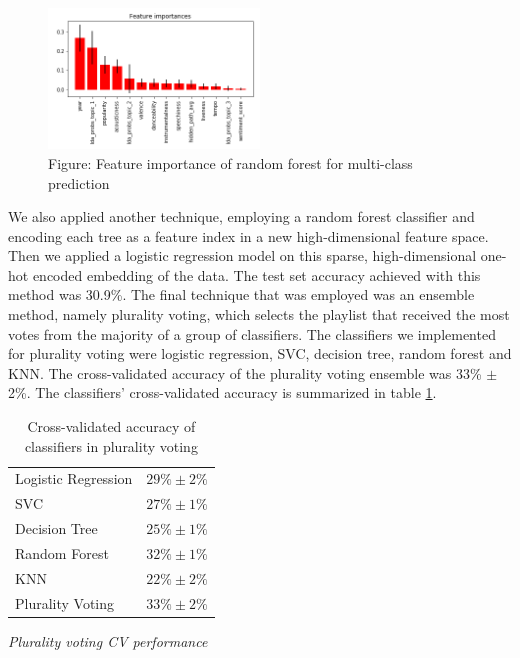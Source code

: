 \documentclass[acmtog]{acmart}
\begin{document}
\begin{figure}[h]
  \includegraphics[width=0.5\textwidth]{feature_importance2.png}
  \caption{Figure: Feature importance of random forest for multi-class prediction}
  \label{fig:ROC_curve}
\end{figure}

\newpage

We also applied another technique, employing a random forest classifier and encoding each tree as a feature index in a new high-dimensional feature space. Then we applied a logistic regression model on this sparse, high-dimensional one-hot encoded embedding of the data. The test set accuracy achieved with this method was 30.9\%.
The final technique that was employed was an ensemble method, namely plurality voting, which selects the playlist that received the most votes from the majority of a group of classifiers. The classifiers we implemented for plurality voting were logistic regression, SVC, decision tree, random forest and KNN. The cross-validated accuracy of the plurality voting ensemble was 33\% $\pm$ 2\%. The classifiers' cross-validated accuracy is summarized in table \ref{tab:two}.  
\begin{table}%
\caption{Cross-validated accuracy of classifiers in plurality voting}
\label{tab:two}
\begin{minipage}{\columnwidth}
\begin{center}
\begin{tabular}{ll}
  \toprule
  Logistic Regression    & $29\% \pm 2\%$\\
  SVC  & $27\% \pm 1\%$\\
  Decision Tree  & $25\% \pm 1\%$\\
  Random Forest  & $32\% \pm 1\%$\\
  KNN  & $22\% \pm 2\%$\\
  Plurality Voting  & $33\% \pm 2\%$\\
  \bottomrule
\end{tabular}
\end{center}
\bigskip\centering
\footnotesize
 \emph{Plurality voting CV performance} 
\end{minipage}
\end{table}%
\newpage
\end{document}
